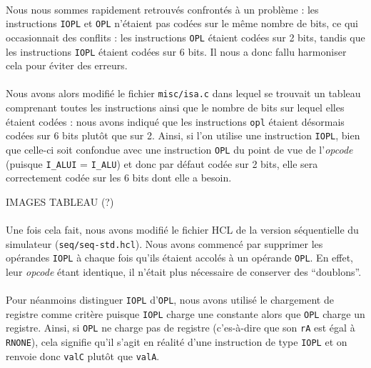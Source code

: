 \documentclass[12pt]{article}
\begin{document}
\paragraph{}Nous nous sommes rapidement retrouvés confrontés à un problème : les instructions \verb+IOPL+ et \verb+OPL+ n'étaient pas codées sur le même nombre de bits, ce qui occasionnait des conflits : les instructions \verb+OPL+ étaient codées sur 2 bits, tandis que les instructions \verb+IOPL+ étaient codées sur 6 bits. Il nous a donc fallu harmoniser cela pour éviter des erreurs.

\paragraph{}Nous avons alors modifié le fichier \verb+misc/isa.c+ dans lequel se trouvait un tableau comprenant toutes les instructions ainsi que le nombre de bits sur lequel elles étaient codées : nous avons indiqué que les instructions \verb+opl+ étaient désormais codées sur 6 bits plutôt que sur 2. Ainsi, si l'on utilise une instruction \verb+IOPL+, bien que celle-ci soit confondue avec une instruction \verb+OPL+ du point de vue de l'{\itshape opcode} (puisque \verb+I_ALUI+ = \verb+I_ALU+) et donc par défaut codée sur 2 bits, elle sera correctement codée sur les 6 bits dont elle a besoin. 

IMAGES TABLEAU (?)

\paragraph{}Une fois cela fait, nous avons modifié le fichier HCL de la version séquentielle du simulateur (\verb+seq/seq-std.hcl+). Nous avons commencé par supprimer les opérandes \verb+IOPL+ à chaque fois qu'ils étaient accolés à un opérande \verb+OPL+. En effet, leur {\itshape opcode} étant identique, il n'était plus nécessaire de conserver des ``doublons''.

\paragraph{}Pour néanmoins distinguer \verb+IOPL+ d'\verb+OPL+, nous avons utilisé le chargement de registre comme critère puisque \verb+IOPL+ charge une constante alors que \verb+OPL+ charge un registre. Ainsi, si \verb+OPL+ ne charge pas de registre (c'es-à-dire que son \verb+rA+ est égal à \verb+RNONE+), cela signifie qu'il s'agit en réalité d'une instruction de type \verb+IOPL+ et on renvoie donc \verb+valC+ plutôt que \verb+valA+.
\end{document}
